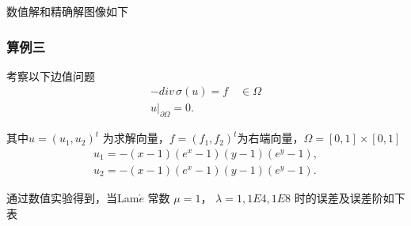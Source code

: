 \documentclass[a4paper,UTF8,titlepage,10pt]{ctexart}
\numberwithin{equation}{subsection}
\begin{document}
数值解和精确解图像如下

\begin{figure}[ht]
	\centering
	\caption{}
\end{figure}

\iffalse
\newpage

\subsubsection{算例三}

考察以下边值问题
$$
\begin{matrix}
	-div \, \sigma(u) = f \quad \in \Omega  \\
	u |_{\partial \Omega} = 0 .
\end{matrix}
$$ 
\par
其中$ u = (u_1,u_2)^t $ 为求解向量，$ f = (f_1,f_2)^t $为右端向量，$ \Omega = [0,1] \times [0,1] $
$$
\begin{matrix}
	u_1 = -(x-1) (e^x-1) (y-1) (e^y-1) ,
	\\
	u_2 = -(x-1) (e^x-1) (y-1) (e^y-1) .
\end{matrix}
$$

通过数值实验得到，当Lam$\acute{e}$ 常数 $\mu =1$， $\lambda = 1, 1E4, 1E8$ 时的误差及误差阶如下表
\end{document}
